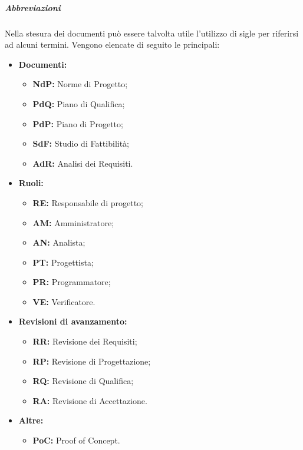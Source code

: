   \subparagraph*{Abbreviazioni}
  Nella stesura dei documenti può essere talvolta utile l'utilizzo di sigle per riferirsi ad alcuni termini. Vengono elencate di seguito le principali:
  \begin{itemize}
  	\item \textbf{Documenti:}
  	\begin{itemize}
  		\item \textbf{NdP:} Norme di Progetto;
  		\item \textbf{PdQ:} Piano di Qualifica;
  		\item \textbf{PdP:} Piano di Progetto;
  		\item \textbf{SdF:} Studio di Fattibilità;
  		\item \textbf{AdR:} Analisi dei Requisiti.
  	\end{itemize}
  	\item \textbf{Ruoli:}
  	\begin{itemize}
  		\item \textbf{RE:} Responsabile di progetto;
  		\item \textbf{AM:} Amministratore;
  		\item \textbf{AN:} Analista;
  		\item \textbf{PT:} Progettista;
  		\item \textbf{PR:} Programmatore;
  		\item \textbf{VE:} Verificatore. 
  	\end{itemize}
  	\item \textbf{Revisioni di avanzamento:}
  	\begin{itemize}
  		\item \textbf{RR:} Revisione dei Requisiti;
  		\item \textbf{RP:} Revisione di Progettazione;
  		\item \textbf{RQ:} Revisione di Qualifica;
  		\item \textbf{RA:} Revisione di Accettazione.
  	\end{itemize}
  \item \textbf{Altre:}
	  \begin{itemize}
	  	\item \textbf{PoC:} Proof of Concept.
	  \end{itemize}
  \end{itemize}

